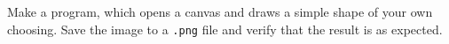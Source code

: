 Make a program, which opens a canvas and draws a simple shape of your own choosing. Save the image to a \lstinline[language=console]{.png} file and verify that the result is as expected.